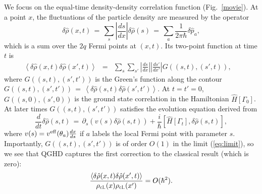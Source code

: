 \documentclass[twocolumn,amsfonts,showpacs,superscriptaddress]{revtex4-1}
\begin{document}
We focus on the equal-time density-density correlation function (Fig.~\ref{movie}). At a point $x$, the fluctuations of the particle density are measured by the operator 
\begin{equation}
	\delta \hat{\rho} (x,t) \, = \, \sum_s  \left| \frac{ds}{dx} \right| \delta \hat{\rho} (s) \, = \, \sum_{a}  \frac{1}{2\pi \hbar} \delta \hat{p}_a ,
\end{equation}
which is a sum over the $2q$ Fermi points at $(x,t)$. Its two-point function at time $t$ is
\begin{eqnarray} \label{rhorho}
	\left< \delta \hat{\rho} (x,t) \delta \hat{\rho} (x',t) \right>  &=&  \sum_{s} \sum_{s'} \left| \frac{ds}{dx} \right|  \left| \frac{ds'}{dx'} \right| G((s,t),(s',t)) , \nonumber\quad
\end{eqnarray}
where $ G((s,t),(s',t'))$ is the Green's function along the contour $G((s,t) ,(s' ,t')) \, = \, \left< \delta \hat{\rho} (s,t) \delta \hat{\rho} (s',t') \right>$. At $t=t'=0$, $G((s,0),(s',0))$ is the ground state correlation in the Hamiltonian $\hat{H}[\Gamma_0]$. At later times $G((s,t),(s',t'))$ satisfies the evolution equation derived from
\begin{equation}
	\frac{d}{dt} \delta \hat{\rho} (s,t) \, = \, \partial_s (v(s) \delta \hat{\rho} (s,t)) + \frac{i}{\hbar} [ \hat{H} [\Gamma_t], \delta \hat{\rho}(s,t) ] ,
\end{equation}
where $v(s) = v^{\rm eff} (\theta_a) \frac{dx}{ds}$ if $a$ labels the local Fermi point with parameter $s$. Importantly, $G((s,t),(s',t'))$ is of order $O(1)$ in the limit (\ref{eq:limit}), so we see that QGHD captures the first correction to the classical result (which is zero):
\begin{eqnarray}
	\frac{ \left< \delta \hat{\rho} (x,t) \delta \hat{\rho} (x',t) \right> }{\rho_{\rm cl.} (x) \rho_{\rm cl.} (x') 
} = O(\hbar^2) .
\end{eqnarray}
\end{document}
